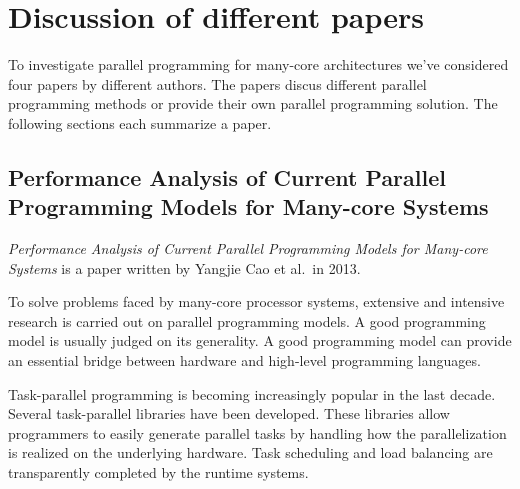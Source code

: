 \section{Discussion of different papers} \label{papers}

To investigate parallel programming for many-core architectures we've
considered four papers by different authors. The papers discus different
parallel programming methods or provide their own parallel programming
solution. The following sections each summarize a paper.

\subsection{Performance Analysis of Current Parallel Programming Models for Many-core Systems}

\emph{Performance Analysis of Current Parallel Programming Models for Many-core
Systems} \cite{CaoPerformanceAnalysis} is a paper written by Yangjie Cao et
al.\ in 2013.

%

To solve problems faced by many-core processor systems, extensive and intensive
research is carried out on parallel programming models. A good programming
model is usually judged on its generality. A good programming model can provide
an essential bridge between hardware and high-level programming languages.


Task-parallel programming is becoming increasingly popular in the last decade.
Several task-parallel libraries have been developed. These libraries allow
programmers to easily generate parallel tasks by handling how the
parallelization is realized on the underlying hardware.  Task scheduling and
load balancing are transparently completed by the runtime systems.

